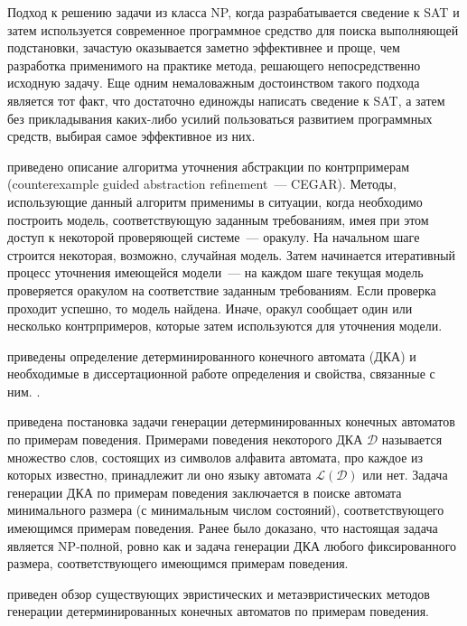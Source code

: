 Подход к решению задачи из класса NP, когда разрабатывается сведение к SAT и затем используется современное программное средство для поиска выполняющей подстановки, зачастую оказывается заметно эффективнее и проще, чем разработка применимого на практике метода, решающего непосредственно исходную задачу.
Еще одним немаловажным достоинством такого подхода является тот факт, что достаточно единожды написать сведение к SAT, а затем без прикладывания каких-либо усилий пользоваться развитием программных средств, выбирая самое эффективное из них.

\insection{\ref{sec:review:cegar}} приведено описание алгоритма уточнения абстракции по контрпримерам (counterexample guided abstraction refinement~{---} CEGAR). 
Методы, использующие данный алгоритм применимы в ситуации, когда необходимо построить модель, соответствующую заданным требованиям, имея при этом доступ к некоторой проверяющей системе~--- оракулу. 
На начальном шаге строится некоторая, возможно, случайная модель.
Затем начинается итеративный процесс уточнения имеющейся модели~--- на каждом шаге текущая модель проверяется оракулом на соответствие заданным требованиям. 
Если проверка проходит успешно, то модель найдена.
Иначе, оракул сообщает один или несколько контрпримеров, которые затем используются для уточнения модели.

\insection{\ref{sec:review:dfa-def}} приведены определение детерминированного конечного автомата (ДКА) и необходимые в диссертационной работе определения и свойства, связанные с ним.
.

\insection{\ref{sec:review:dfa-inf}} приведена постановка задачи генерации детерминированных конечных автоматов по примерам поведения. 
Примерами поведения некоторого ДКА $\mathcal{D}$ называется множество слов, состоящих из символов алфавита автомата, про каждое из которых известно, принадлежит ли оно языку автомата $\mathcal{L}\left(\mathcal{D}\right)$ или нет.
Задача генерации ДКА по примерам поведения заключается в поиске автомата минимального размера (с минимальным числом состояний), соответствующего имеющимся примерам поведения.
Ранее было доказано, что настоящая задача является NP-полной, ровно как и задача генерации ДКА любого фиксированного размера, соответствующего имеющимся примерам поведения.

\insection{\ref{sec:review:heuristic-dfa-inf}} приведен обзор существующих эвристических и метаэвристических методов генерации детерминированных конечных автоматов по примерам поведения. 

